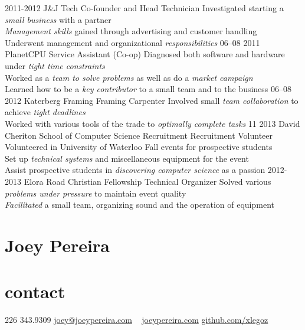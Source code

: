 \documentclass[]{friggeri-cv}
\newcommand{\imp}[1] {{\em #1}}
\begin{document}
\begin{entrylist}
  \entry
  	{2011-2012}
  	{J\&J Tech}
  	{Co-founder and Head Technician}
  	{Investigated starting a \imp{small business} with a partner \\
	\imp{Management skills} gained through advertising and customer handling \\
	Underwent management and organizational \imp{responsibilities}}
  \entry
    {06–08 2011}
    {PlanetCPU}
    {Service Assistant (Co-op)}
    {Diagnosed both software and hardware under \imp{tight time constraints} \\	Worked as a \imp{team to solve problems} as well as do a \imp{market campaign} \\
    Learned how to be a \imp{key contributor} to a small team and to the business}
  \entry
    {06–08 2012}
    {Katerberg Framing}
    {Framing Carpenter}
    {Involved small \imp{team collaboration} to achieve \imp{tight deadlines} \\
    Worked with various tools of the trade to \imp{optimally complete tasks}  
   }
  \entry
  	{11 2013}
  	{David Cheriton School of Computer Science Recruitment}
  	{Recruitment Volunteer}
	{Volunteered in University of Waterloo Fall events for prospective students \\
  	Set up \imp{technical systems} and miscellaneous equipment for the event \\
	Assist prospective students in \imp{discovering computer science} as a passion}
  \entry
  	{2012-2013}
  	{Elora Road Christian Fellowship}
  	{Technical Organizer}
	{Solved various \imp{problems under pressure} to maintain event quality\\
	\imp{Facilitated} a small team, organizing sound and the operation of equipment}
  	

\end{entrylist}

\newpage

\begin{asidetwo}  	
	\section{Joey Pereira}
	\section{contact}
    226 343.9309
    \href{mailto:joey@joeypereira.com}{joey@joeypereira.com}
    ~
    \href{http://joeypereira.com}{joeypereira.com}
    \href{http://www.github.com/xlegoz}{github.com/xlegoz}
\end{asidetwo}
\end{document}
